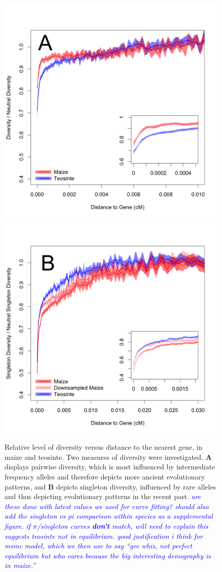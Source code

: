 \documentclass{pnastwo}
\newcommand{\jri}[1]{\textcolor{blue}{\emph{#1}} }
\begin{document}
\begin{article}
\begin{figure}[b]
\centering
\includegraphics[width=.45\textwidth]{FigsAndFiles/distanceToGene_WithSignificance_Folded2_manuscript.png} \includegraphics[width=.45\textwidth]{FigsAndFiles/distanceToGene_WithSignificance_Singletons_Downsampled_threeLines_manuscript.png}
\caption{Relative level of diversity versus distance to the nearest
  gene, in maize and teosinte. Two measures of diversity were
  investigated. \textbf{A} displays pairwise
  diversity, which is most influenced by intermediate frequency
  alleles and therefore depicts more ancient evolutionary patterns,
  and \textbf{B} depicts singleton diversity, influenced by rare
  alleles and thus depicting evolutionary patterns in the recent
  past. \label{fig:purify} \jri{are these done with latest values we used for curve fitting? should also add the singleton vs pi comparison within species as a supplemental figure. if $\pi$/singleton curves {\bf don't} match, will need to explain this suggests teosinte not in equilibrium.  good justification i think for msmc model, which we then use to say ``gee whiz, not perfect equilibrium but who cares because the big interesting demography is in maize.'' }}
\end{figure}



\end{article}
\end{document}

